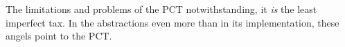 The limitations and problems of the PCT notwithstanding, it \emph{is} the least imperfect tax. In the abstractions even more than in its implementation, these angels point to the PCT. 










